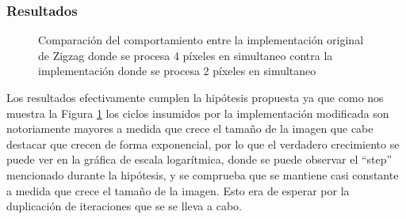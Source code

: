 \documentclass[a4paper]{article}
\begin{document}
\subsubsection{Resultados}
\begin{figure}[h!]
    \centering
    \qquad
    \caption{Comparación del comportamiento entre la implementación original de Zigzag donde se procesa 4 píxeles en simultaneo contra la implementación donde se procesa 2 píxeles en simultaneo}%
    \label{fig:exp-zigzag-2-pix}%
\end{figure}

Los resultados efectivamente cumplen la hipótesis propuesta ya que como nos muestra la Figura \ref{fig:exp-zigzag-2-pix} los ciclos insumidos por la implementación modificada son notoriamente mayores a medida que crece el tamaño de la imagen que cabe destacar que crecen de forma exponencial, por lo que el verdadero crecimiento se puede ver en la gráfica de escala logarítmica, donde se puede observar el ``step'' mencionado durante la hipótesis, y se comprueba que se mantiene casi constante a medida que crece el tamaño de la imagen. Esto era de esperar por la duplicación de iteraciones que se se lleva a cabo.
\end{document}
